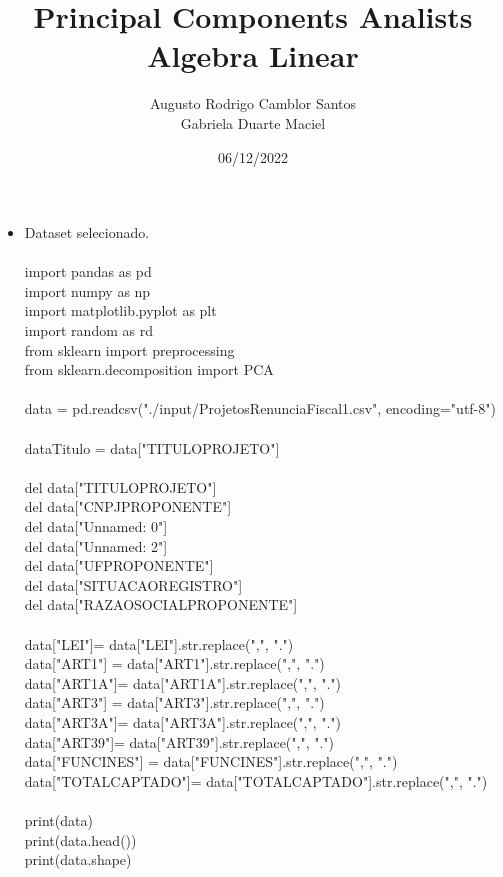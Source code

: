 \documentclass{article}
\title{ Principal Components Analists \\ Algebra Linear}
\date{06/12/2022}
\author{Augusto Rodrigo Camblor Santos\\Gabriela Duarte Maciel\\}
\begin{document}
\maketitle


\begin{itemize}
\item Dataset selecionado. \\ \\
import pandas as pd\\
import numpy as np\\
import matplotlib.pyplot as plt\\
import random as rd\\
from sklearn import preprocessing \\
from sklearn.decomposition import PCA\\ \\
data = pd.read\textunderscore csv("./input/ProjetosRenunciaFiscal1.csv", encoding="utf-8") \\ \\
dataTitulo = data["TITULO\textunderscore PROJETO"]\\ \\
del data["TITULO\textunderscore PROJETO"]\\
del data["CNPJ\textunderscore PROPONENTE"]\\
del data["Unnamed: 0"]\\
del data["Unnamed: 2"]\\
del data["UF\textunderscore PROPONENTE"]\\
del data["SITUACAO\textunderscore REGISTRO"]\\
del data["RAZAO\textunderscore SOCIAL\textunderscore PROPONENTE"]\\ \\
data["LEI"]= data["LEI"].str.replace(",", ".")\\
data["ART1"] = data["ART1"].str.replace(",", ".")\\
data["ART1A"]= data["ART1A"].str.replace(",", ".")\\
data["ART3"] = data["ART3"].str.replace(",", ".")\\
data["ART3A"]= data["ART3A"].str.replace(",", ".")\\
data["ART39"]= data["ART39"].str.replace(",", ".")\\
data["FUNCINES"] = data["FUNCINES"].str.replace(",", ".")\\
data["TOTAL\textunderscore CAPTADO"]= data["TOTAL\textunderscore CAPTADO"].str.replace(",", ".")\\ \\
print(data)\\
print(data.head())\\
print(data.shape)\\ \\
\end{itemize}
\end{document}
